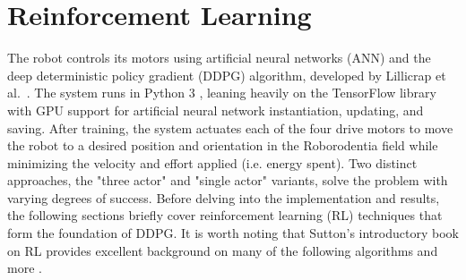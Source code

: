 \chapter{Reinforcement Learning}
The robot controls its motors using artificial neural networks (ANN) and the deep deterministic policy gradient (DDPG) algorithm, developed by Lillicrap et al.\ \cite{lillicrap_2016}. The system runs in Python 3 \cite{python3}, leaning heavily on the TensorFlow library with GPU support \cite{tensorflow} for artificial neural network instantiation, updating, and saving. After training, the system actuates each of the four drive motors to move the robot to a desired position and orientation in the Roborodentia field while minimizing the velocity and effort applied (i.e. energy spent). Two distinct approaches, the "three actor" and "single actor" variants, solve the problem with varying degrees of success. Before delving into the implementation and results, the following sections briefly cover reinforcement learning (RL) techniques that form the foundation of DDPG. It is worth noting that Sutton's introductory book on RL provides excellent background on many of the following algorithms and more \cite{sutton_2017}. 

